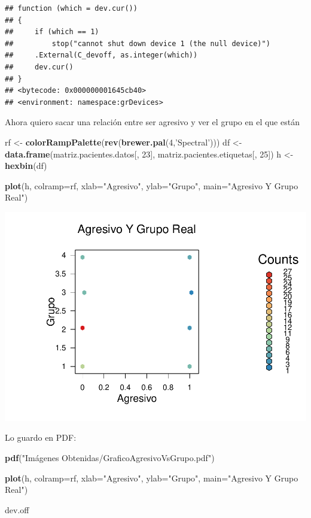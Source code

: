 \documentclass[]{article}
\newenvironment{Shaded}{\begin{snugshade}}{\end{snugshade}}
\newcommand{\DataTypeTok}[1]{\textcolor[rgb]{0.13,0.29,0.53}{#1}}
\newcommand{\DecValTok}[1]{\textcolor[rgb]{0.00,0.00,0.81}{#1}}
\newcommand{\KeywordTok}[1]{\textcolor[rgb]{0.13,0.29,0.53}{\textbf{#1}}}
\newcommand{\NormalTok}[1]{#1}
\newcommand{\StringTok}[1]{\textcolor[rgb]{0.31,0.60,0.02}{#1}}
\begin{document}
\begin{verbatim}
## function (which = dev.cur()) 
## {
##     if (which == 1) 
##         stop("cannot shut down device 1 (the null device)")
##     .External(C_devoff, as.integer(which))
##     dev.cur()
## }
## <bytecode: 0x000000001645cb40>
## <environment: namespace:grDevices>
\end{verbatim}

Ahora quiero sacar una relación entre ser agresivo y ver el grupo en el
que están

\begin{Shaded}
\begin{Highlighting}[]
\NormalTok{rf <-}\StringTok{ }\KeywordTok{colorRampPalette}\NormalTok{(}\KeywordTok{rev}\NormalTok{(}\KeywordTok{brewer.pal}\NormalTok{(}\DecValTok{4}\NormalTok{,}\StringTok{'Spectral'}\NormalTok{)))}
\NormalTok{df <-}\StringTok{ }\KeywordTok{data.frame}\NormalTok{(matriz.pacientes.datos[, }\DecValTok{23}\NormalTok{], matriz.pacientes.etiquetas[, }\DecValTok{25}\NormalTok{])}
\NormalTok{h <-}\StringTok{ }\KeywordTok{hexbin}\NormalTok{(df)}

\KeywordTok{plot}\NormalTok{(h, }\DataTypeTok{colramp=}\NormalTok{rf, }\DataTypeTok{xlab=}\StringTok{"Agresivo"}\NormalTok{, }\DataTypeTok{ylab=}\StringTok{"Grupo"}\NormalTok{, }\DataTypeTok{main=}\StringTok{"Agresivo Y Grupo Real"}\NormalTok{)}
\end{Highlighting}
\end{Shaded}

\includegraphics{codigo_files/figure-latex/grafico_agresivo_grupo-1.pdf}

Lo guardo en PDF:

\begin{Shaded}
\begin{Highlighting}[]
\KeywordTok{pdf}\NormalTok{(}\StringTok{"Imágenes Obtenidas/GraficoAgresivoVsGrupo.pdf"}\NormalTok{)}

\KeywordTok{plot}\NormalTok{(h, }\DataTypeTok{colramp=}\NormalTok{rf, }\DataTypeTok{xlab=}\StringTok{"Agresivo"}\NormalTok{, }\DataTypeTok{ylab=}\StringTok{"Grupo"}\NormalTok{, }\DataTypeTok{main=}\StringTok{"Agresivo Y Grupo Real"}\NormalTok{)}

\NormalTok{dev.off}
\end{Highlighting}
\end{Shaded}
\end{document}
